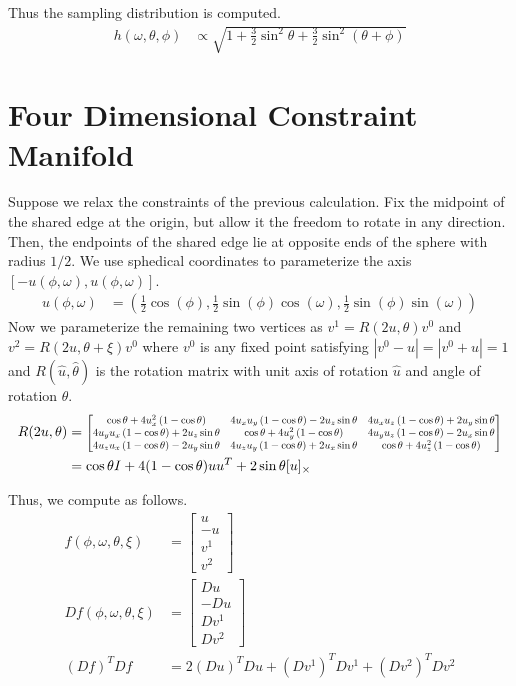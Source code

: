 \documentclass[12pt]{article}
\newcommand*{\Scale}[2][4]{\scalebox{#1}{$#2$}}%
\begin{document}
Thus the sampling distribution is computed.
\begin{align}
h(\omega, \theta, \phi) &\propto \sqrt{1 + \frac{3}{2}\sin^2\theta + \frac{3}{2}\sin^2(\theta + \phi)}
\end{align}

\section{Four Dimensional Constraint Manifold} 

Suppose we relax the constraints of the previous calculation. Fix the midpoint of the shared edge at the origin, but allow it the freedom to rotate in any direction. Then, the endpoints of the shared edge lie at opposite ends of the sphere with radius $1/2$. We use sphedical coordinates to parameterize the axis $[-u(\phi,\omega),u(\phi,\omega)]$.
\begin{align}
u(\phi,\omega) &= \left(\frac{1}{2}\cos(\phi),\frac{1}{2}\sin(\phi)\cos(\omega), \frac{1}{2}\sin(\phi)\sin(\omega) \right)
\end{align}
Now we parameterize the remaining two vertices as $v^1 = R(2u, \theta)v^0$ and $v^2 = R(2u, \theta + \xi)v^0$ where $v^0$ is any fixed point satisfying $|v^0 - u| = |v^0 + u| = 1$ and $R(\hat{u},\hat{\theta})$ is the rotation matrix with unit axis of rotation $\hat{u}$ and angle of rotation $\hat{\theta}$. 
\begin{align}
R(2u,\theta) &= \Scale[0.75]{\begin{bmatrix} \cos \theta + 4u_x^2 \left(1-\cos \theta\right) & 4u_x u_y \left(1-\cos \theta\right) - 2u_z \sin \theta & 4u_x u_z \left(1-\cos \theta\right) + 2u_y \sin \theta \\ 4u_y u_x \left(1-\cos \theta\right) + 2u_z \sin \theta & \cos \theta + 4u_y^2\left(1-\cos \theta\right) & 4u_y u_z \left(1-\cos \theta\right) - 2u_x \sin \theta \\ 4u_z u_x \left(1-\cos \theta\right) - 2u_y \sin \theta   & 4u_z u_y \left(1-\cos \theta\right) + 2u_x \sin \theta & \cos \theta + 4u_z^2\left(1-\cos \theta\right) 
\end{bmatrix}} \\
&= \cos\theta I + 4(1-\cos\theta)uu^T + 2\sin\theta[u]_\times \\
\end{align}

Thus, we compute as follows. 
\begin{align}
  f(\phi, \omega, \theta, \xi) &= \begin{bmatrix} u \\ -u \\ v^1 \\ v^2 \end{bmatrix} \\
  Df(\phi, \omega, \theta, \xi) &= \begin{bmatrix} Du \\ -Du \\ Dv^1 \\ Dv^2 \end{bmatrix} \\
  \left(Df\right)^TDf &=   2\left(Du\right)^TDu  + \left(Dv^1\right)^TDv^1 + \left(Dv^2\right)^TDv^2 
\end{align}
\end{document}
